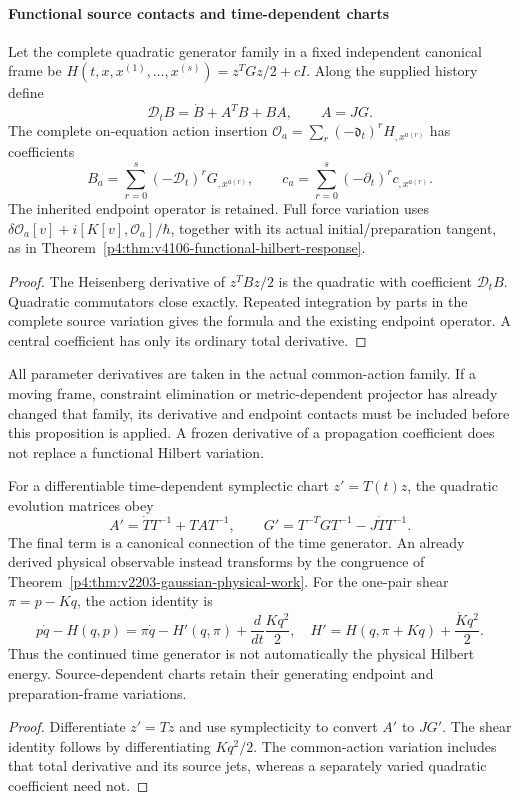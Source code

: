 \documentclass[12pt,a4paper]{article}
\begin{document}
\paragraph{Functional source contacts and time-dependent charts}
\begin{proposition}
\label{p4:prop:v2203-gaussian-functional-work}
Let the complete quadratic generator family in a fixed independent
canonical frame be
\(H(t,x,x^{(1)},\ldots,x^{(s)})=z^TGz/2+cI\).
Along the supplied history define
\[
 \mathcal D_tB=\dot B+A^TB+BA,\qquad A=JG.
\]
The complete on-equation action insertion
\(\mathcal O_a=\sum_r(-\mathfrak d_t)^rH_{,x^{a(r)}}\) has coefficients
\[
 \boxed{B_a=\sum_{r=0}^s(-\mathcal D_t)^rG_{,x^{a(r)}},\qquad
 c_a=\sum_{r=0}^s(-\partial_t)^rc_{,x^{a(r)}}.}
\]
The inherited endpoint operator is retained.  Full force variation uses
\(\delta\mathcal O_a[v]+i[K[v],\mathcal O_a]/\hbar\), together with
its actual initial/preparation tangent, as in
Theorem~\ref{p4:thm:v4106-functional-hilbert-response}.
\end{proposition}
\begin{proof}
The Heisenberg derivative of \(z^TBz/2\) is the quadratic with
coefficient \(\mathcal D_tB\).  Quadratic commutators close exactly.
Repeated integration by parts in the complete source variation gives
the formula and the existing endpoint operator.  A central coefficient
has only its ordinary total derivative.
\end{proof}
All parameter derivatives are taken in the actual common-action family.
If a moving frame, constraint elimination or metric-dependent projector
has already changed that family, its derivative and endpoint contacts
must be included before this proposition is applied.  A frozen derivative
of a propagation coefficient does not replace a functional Hilbert
variation.

\begin{proposition}
\label{p4:prop:v2203-time-dependent-chart-work}
For a differentiable time-dependent symplectic chart \(z'=T(t)z\),
the quadratic evolution matrices obey
\[
 A'=\dot TT^{-1}+TAT^{-1},\qquad
 G'=T^{-T}GT^{-1}-J\dot TT^{-1}.
\]
The final term is a canonical connection of the time generator.  An
already derived physical observable instead transforms by the
congruence of Theorem~\ref{p4:thm:v2203-gaussian-physical-work}.
For the one-pair shear \(\pi=p-Kq\), the action identity is
\[
 p\dot q-H(q,p)
 =\pi\dot q-H'(q,\pi)+\frac{d}{dt}\frac{Kq^2}{2},
 \quad H'=H(q,\pi+Kq)+\frac{\dot Kq^2}{2}.
\]
Thus the continued time generator is not automatically the physical
Hilbert energy.  Source-dependent charts retain their generating
endpoint and preparation-frame variations.
\end{proposition}
\begin{proof}
Differentiate \(z'=Tz\) and use symplecticity to convert \(A'\) to
\(JG'\).  The shear identity follows by differentiating \(Kq^2/2\).
The common-action variation includes that total derivative and its
source jets, whereas a separately varied quadratic coefficient need not.
\end{proof}
\end{document}
